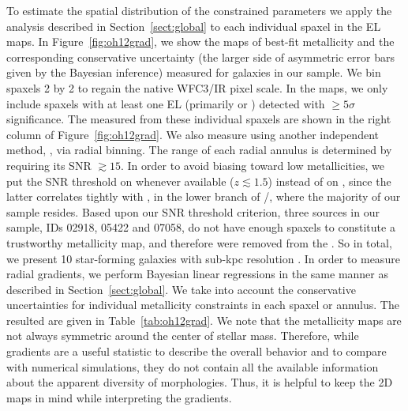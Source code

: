 To estimate the spatial distribution of the constrained parameters we apply the analysis
described in Section~\ref{sect:global} to each individual spaxel in the EL maps.
In Figure~\ref{fig:oh12grad}, we show the maps of best-fit
metallicity and the corresponding conservative uncertainty (the larger side of asymmetric
error bars given by the Bayesian inference) measured for galaxies in our \mg sample.  We bin
spaxels 2 by 2 to regain the native WFC3/IR pixel scale.
In the maps, we only include spaxels with at least one EL
(primarily \Ha or \OIII) detected with $\geq5\sigma$ significance. The \mgs measured from
these individual spaxels are shown in the right column of Figure~\ref{fig:oh12grad}. We also
measure \mgs using another independent method, \ie, via radial binning.  The range of each
radial annulus is determined by requiring its SNR $\gtrsim15$.  In
order to avoid biasing toward low metallicities, we put the SNR threshold on \Ha whenever
available (\ie $z\lesssim1.5$) instead of on \OIII, since the latter correlates tightly with
\oh, in the lower branch of \OIII/\Hb, where the majority of our sample resides.  Based upon
our SNR threshold criterion, three sources in our sample, IDs 02918, 05422 and 07058, do not
have enough spaxels to constitute a trustworthy metallicity map, and therefore were removed from the \sra.
So in total, we present 10 star-forming galaxies with sub-kpc resolution \mms.
In order to measure radial gradients, we perform Bayesian linear regressions in the same manner as described in 
Section~\ref{sect:global}.
We take into account the conservative uncertainties for individual metallicity constraints in each spaxel or annulus.
The resulted \mgs are given in Table~\ref{tab:oh12grad}.
We note that the metallicity maps are not always symmetric around
the center of stellar mass. Therefore, while gradients are a useful statistic to describe the overall behavior and to compare with
numerical simulations, they do not contain all the available information about the apparent diversity of morphologies.  Thus, it
is helpful to keep the 2D maps in mind while interpreting the gradients.

